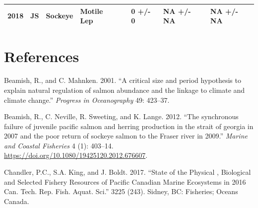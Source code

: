 \documentclass[fleqn,10pt]{wlpeerj} %
\begin{document}
\begin{longtable}[]{@{}llllrlll@{}}
\begin{minipage}[t]{0.04\columnwidth}
2018\strut
\end{minipage} & \begin{minipage}[t]{0.06\columnwidth}\raggedright
JS\strut
\end{minipage} & \begin{minipage}[t]{0.07\columnwidth}\raggedright
Sockeye\strut
\end{minipage} & \begin{minipage}[t]{0.13\columnwidth}\raggedright
Motile Lep\strut
\end{minipage} & \begin{minipage}[t]{0.03\columnwidth}\raggedleft
85\strut
\end{minipage} & \begin{minipage}[t]{0.15\columnwidth}\raggedright
0 +/- 0\strut
\end{minipage} & \begin{minipage}[t]{0.16\columnwidth}\raggedright
NA +/- NA\strut
\end{minipage} & \begin{minipage}[t]{0.15\columnwidth}\raggedright
NA +/- NA\strut
\end{minipage}\tabularnewline
\bottomrule
\end{longtable}

\hypertarget{references}{%
\section*{References}\label{references}}

\hypertarget{refs}{}
\leavevmode\hypertarget{ref-Beamish2001}{}%
Beamish, R., and C. Mahnken. 2001. ``A critical size and period hypothesis to explain natural regulation of salmon abundance and the linkage to climate and climate change.'' \emph{Progress in Oceanography} 49: 423--37.

\leavevmode\hypertarget{ref-Beamish2012}{}%
Beamish, R., C. Neville, R. Sweeting, and K. Lange. 2012. ``The synchronous failure of juvenile pacific salmon and herring production in the strait of georgia in 2007 and the poor return of sockeye salmon to the Fraser river in 2009.'' \emph{Marine and Coastal Fisheries} 4 (1): 403--14. \url{https://doi.org/10.1080/19425120.2012.676607}.

\leavevmode\hypertarget{ref-Chandler2017}{}%
Chandler, P.C., S.A. King, and J. Boldt. 2017. ``State of the Physical , Biological and Selected Fishery Resources of Pacific Canadian Marine Ecosystems in 2016 Can. Tech. Rep. Fish. Aquat. Sci.'' 3225 (243). Sidney, BC: Fisheries; Oceans Canada.
\end{document}
